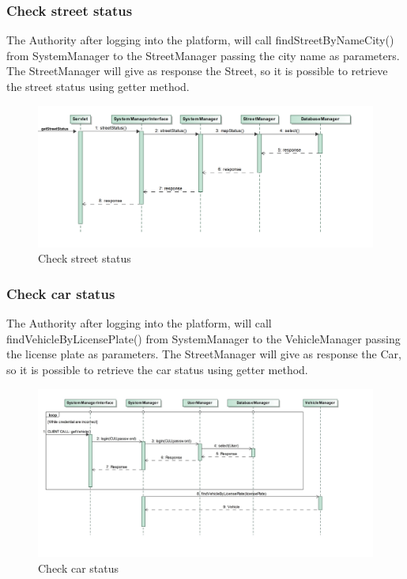 \subsubsection{Check street status}
The Authority after logging into the platform, will call findStreetByNameCity() from SystemManager to the StreetManager passing the city name as parameters. The StreetManager will give as response the Street, so it is possible to retrieve the street status using getter method.
\begin{figure}[H]
	\centering
	\includegraphics[width=0.95\linewidth, height=0.35\textheight]{Images/RunTimeDiagram/Sequence5}
	\caption{Check street status}
	\label{fig:Check street status}
\end{figure}
\subsubsection{Check car status}
The Authority after logging into the platform, will call findVehicleByLicensePlate() from SystemManager to the VehicleManager passing the license plate as parameters. The StreetManager will give as response the Car, so it is possible to retrieve the car status using getter method.
\begin{figure}[H]
	\centering
	\includegraphics[width=0.95\linewidth, height=0.35\textheight]{Images/RunTimeDiagram/Sequence6}
	\caption{Check car status}
	\label{fig:Check car status}
\end{figure}


